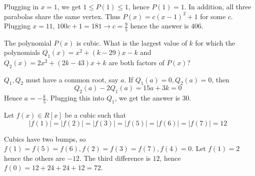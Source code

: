 \documentclass[11pt]{scrartcl}
\begin{document}
\begin{soln}
  Plugging in $x=1$, we get $1\le P(1)\le 1$, hence $P(1)=1$. In addition, all three parabolas share the same vertex.
  Thus $P(x)=c(x-1)^2+1$ for some $c$. Plugging $x=11$, $100c+1=181\to c=\frac{9}{5}$ hence the answer is $406$.
\end{soln}
\begin{example}
  [AIME 2007]
  The polynomial $P(x)$ is cubic. What is the largest value of $k$ for which
  the polynomials $Q_1(x)=x^2+(k-29)x-k$ and $Q_2(x)=2x^2+(2k-43)x+k$ are
  both factors of $P(x)$?
\end{example}
\begin{soln}
  $Q_1, Q_2$ must have a common root, say $a$. If $Q_1(a)=0, Q_2(a)=0$, then
  $$Q_2(a)-2Q_1(a)=15a+3k=0$$
  Hence $a=-\frac{k}{5}$. Plugging this into $Q_1$, we get the answer is $30$.
\end{soln}
\begin{example}
  [AIME 2015]
  Let $f(x)\in R[x]$ be a cubic such that
  $$|f(1)|=|f(2)|=|f(3)|=|f(5)|=|f(6)|=|f(7)|=12$$
\end{example}
\begin{soln}
  Cubics have two bumps, so $f(1)=f(5)=f(6), f(2)=f(3)=f(7), f(4)=0$.
  Let $f(1)=2$ hence the others are $-12$. The third difference is $12$,
  hence $f(0)=12+24+24+12=72$.
\end{soln}
\end{document}
